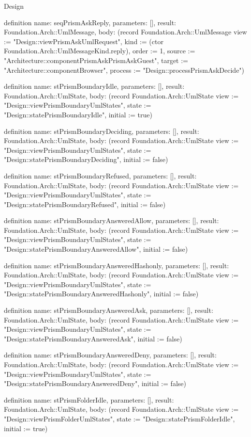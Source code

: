 \begin{lexlean}{Design}
\begin{semanticmodule}
definition{
  name: seqPrismAskReply,
  parameters: [],
  result: Foundation.Arch::UmlMessage,
  body: (record Foundation.Arch::UmlMessage {view := "Design::viewPrismAskUmlRequest", kind := (ctor Foundation.Arch::UmlMessageKind.reply), order := 1, source := "Architecture::componentPrismAskPrismAskGuest", target := "Architecture::componentBrowser", process := "Design::processPrismAskDecide"})
}

definition{
  name: stPrismBoundaryIdle,
  parameters: [],
  result: Foundation.Arch::UmlState,
  body: (record Foundation.Arch::UmlState {view := "Design::viewPrismBoundaryUmlStates", state := "Design::statePrismBoundaryIdle", initial := true})
}

definition{
  name: stPrismBoundaryDeciding,
  parameters: [],
  result: Foundation.Arch::UmlState,
  body: (record Foundation.Arch::UmlState {view := "Design::viewPrismBoundaryUmlStates", state := "Design::statePrismBoundaryDeciding", initial := false})
}

definition{
  name: stPrismBoundaryRefused,
  parameters: [],
  result: Foundation.Arch::UmlState,
  body: (record Foundation.Arch::UmlState {view := "Design::viewPrismBoundaryUmlStates", state := "Design::statePrismBoundaryRefused", initial := false})
}

definition{
  name: stPrismBoundaryAnsweredAllow,
  parameters: [],
  result: Foundation.Arch::UmlState,
  body: (record Foundation.Arch::UmlState {view := "Design::viewPrismBoundaryUmlStates", state := "Design::statePrismBoundaryAnsweredAllow", initial := false})
}

definition{
  name: stPrismBoundaryAnsweredHashonly,
  parameters: [],
  result: Foundation.Arch::UmlState,
  body: (record Foundation.Arch::UmlState {view := "Design::viewPrismBoundaryUmlStates", state := "Design::statePrismBoundaryAnsweredHashonly", initial := false})
}

definition{
  name: stPrismBoundaryAnsweredAsk,
  parameters: [],
  result: Foundation.Arch::UmlState,
  body: (record Foundation.Arch::UmlState {view := "Design::viewPrismBoundaryUmlStates", state := "Design::statePrismBoundaryAnsweredAsk", initial := false})
}

definition{
  name: stPrismBoundaryAnsweredDeny,
  parameters: [],
  result: Foundation.Arch::UmlState,
  body: (record Foundation.Arch::UmlState {view := "Design::viewPrismBoundaryUmlStates", state := "Design::statePrismBoundaryAnsweredDeny", initial := false})
}

definition{
  name: stPrismFolderIdle,
  parameters: [],
  result: Foundation.Arch::UmlState,
  body: (record Foundation.Arch::UmlState {view := "Design::viewPrismFolderUmlStates", state := "Design::statePrismFolderIdle", initial := true})
}


\end{semanticmodule}
\end{lexlean}
